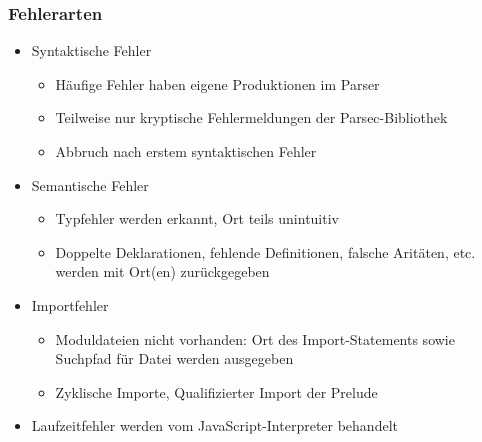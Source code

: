 \begin{frame}
\frametitle{Fehlerarten}
\begin{itemize}
\item Syntaktische Fehler
  \begin{itemize}
  \item Häufige Fehler haben eigene Produktionen im Parser
  \item Teilweise nur kryptische Fehlermeldungen der Parsec-Bibliothek
  \item Abbruch nach erstem syntaktischen Fehler
  \end{itemize}
\item Semantische Fehler
  \begin{itemize}
  \item Typfehler werden erkannt, Ort teils unintuitiv
  \item Doppelte Deklarationen, fehlende Definitionen, falsche Aritäten, etc.
    werden mit Ort(en) zurückgegeben
  \end{itemize}
\item Importfehler
  \begin{itemize}
  \item Moduldateien nicht vorhanden: Ort des Import-Statements
    sowie Suchpfad für Datei werden ausgegeben
  \item Zyklische Importe, Qualifizierter Import der Prelude
  \end{itemize}
\item Laufzeitfehler werden vom JavaScript-Interpreter behandelt
\end{itemize}
\end{frame}
